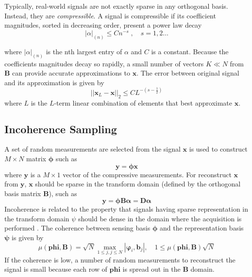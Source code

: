 Typically, real-world signals are not exactly sparse in any orthogonal basis. Instead, they are \emph{compressible}. A signal is compressible if its coefficient magnitudes, sorted in decreasing order, present a power law decay
\begin{equation}
|\alpha|_{(n)} \leq C n^{-s}\;,\quad s=1,2 \ldots
\end{equation}

where $|\alpha|_{(n)}$ is the nth largest entry of $\alpha$ and $C$ is a constant. Because the coefficients magnitudes decay so rapidly, a small number of vectors $K \ll N$ from $\boldsymbol{B}$ can provide accurate
approximations to $\boldsymbol{x}$. The error between original signal and its approximation is given by
\begin{equation}
||\boldsymbol{x}_L - \boldsymbol{x}||_2 \leq CL^{-(s-\frac{1}{2})}
\end{equation}
where $L$ is the $L$-term linear combination of elements that best approximate $\boldsymbol{x}$.  

\subsection{Incoherence Sampling}

A set of random measurements are selected from the signal $\boldsymbol{x}$ is used to construct $M \times N$ matrix $\boldsymbol{\phi}$ such as
\begin{equation}
\boldsymbol{y} = \boldsymbol{\phi x}
\end{equation}
where $\boldsymbol{y}$ is a $M\times 1$ vector of the compressive measurements. For reconstruct $\boldsymbol{x}$ from $\boldsymbol{y}$, $\boldsymbol{x}$ should be sparse in the transform domain (defined by the orthogonal basis matrix $\boldsymbol{B}$), such as
\begin{equation}
\boldsymbol{y}=\boldsymbol{\phi B \alpha}= \boldsymbol{D\alpha}
\end{equation}
Incoherence is related to the property that signals having sparse representation in the transform domain $\psi$ should be dense in the domain where the acquisition is performed \cite{compressive}. The coherence between sensing basis $\boldsymbol{\phi}$ and the representation basis $\boldsymbol{\psi}$ is given by
\begin{equation}
\mu(\boldsymbol{phi},\boldsymbol{B})= \sqrt{N} \max_{1 \leq j, j \leq N} | \boldsymbol{\varphi}_i,\boldsymbol{b}_j|, \quad 1\leq \mu(\boldsymbol{phi},\boldsymbol{B}) \sqrt{N}
\end{equation}
If the coherence is low, a number of random measurements to reconstruct the signal is small because each row of $\boldsymbol{phi}$ is spread out in the $\boldsymbol{B}$ domain.

